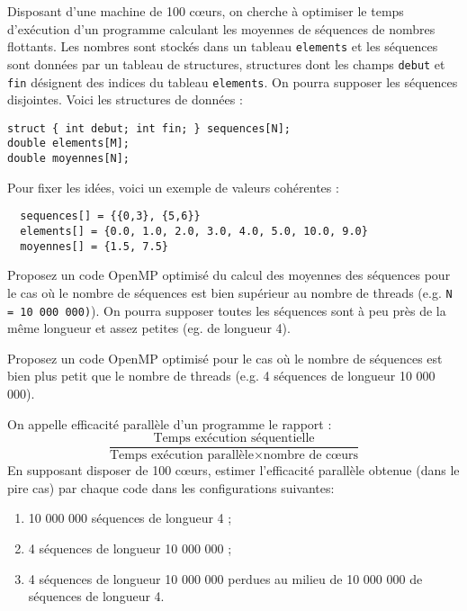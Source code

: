 \documentclass[A4wide]{article}
\begin{document}
\newenvironment{question}
{\addtocounter{numexercice}{1}\noindent{\bf Question \thenumexercice \ }} {\medskip}

Disposant d'une machine de 100 cœurs, on cherche à optimiser le temps
d'exécution d'un programme calculant les moyennes de séquences de
nombres flottants. Les nombres sont stockés dans un tableau
\verb#elements# et les séquences sont données par un tableau de
structures, structures dont les champs \verb#debut# et \verb#fin#
désignent des indices du tableau \verb#elements#. On pourra supposer
les séquences disjointes.  Voici les structures
de données :

\begin{lstlisting}
struct { int debut; int fin; } sequences[N]; 
double elements[M]; 
double moyennes[N]; 
\end{lstlisting}

Pour fixer les idées, voici un exemple de valeurs cohérentes :

 \begin{lstlisting}
  sequences[] = {{0,3}, {5,6}}
  elements[] = {0.0, 1.0, 2.0, 3.0, 4.0, 5.0, 10.0, 9.0}
  moyennes[] = {1.5, 7.5}
\end{lstlisting} 


\begin{question}
  Proposez un code OpenMP optimisé du calcul des moyennes des
  séquences pour le cas où le nombre de séquences est bien supérieur
  au nombre de threads (e.g.  \verb#N = 10 000 000)#). On pourra
  supposer toutes les séquences sont à peu près de la même longueur et
  assez petites (eg. de longueur 4).
\end{question}

\begin{question}
  Proposez un code OpenMP optimisé pour le cas où le nombre de
  séquences est bien plus petit que le nombre de threads (e.g.
  4 séquences de longueur 10 000 000).
\end{question}


\begin{question}
  On appelle efficacité parallèle d'un programme le rapport :
 $$\frac {\mbox{Temps exécution séquentielle}} {\mbox{Temps exécution
     parallèle} \times\mbox{nombre de cœurs}}$$
En supposant disposer de 100 cœurs, estimer l'efficacité parallèle 
obtenue (dans le pire cas)  par chaque code dans les configurations suivantes:
\begin{enumerate}
\item 10 000 000 séquences de longueur 4 ;
\item 4 séquences de longueur 10 000 000 ;
\item 4 séquences de longueur 10 000 000 perdues au milieu de 10 000
  000 de séquences de longueur 4.
\end{enumerate}
\end{question}
\end{document}
